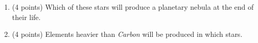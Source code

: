 \documentclass[12pt]{article}
\begin{document}
\begin{enumerate}
\begin{enumerate}
    \item (4 points) Which of these stars will produce a planetary nebula at the end of their life.
    \vspace{.4in}
    \item (4 points) Elements heavier than \textit{Carbon} will be produced in which stars.
\end{enumerate}

\end{enumerate}
\end{document}
